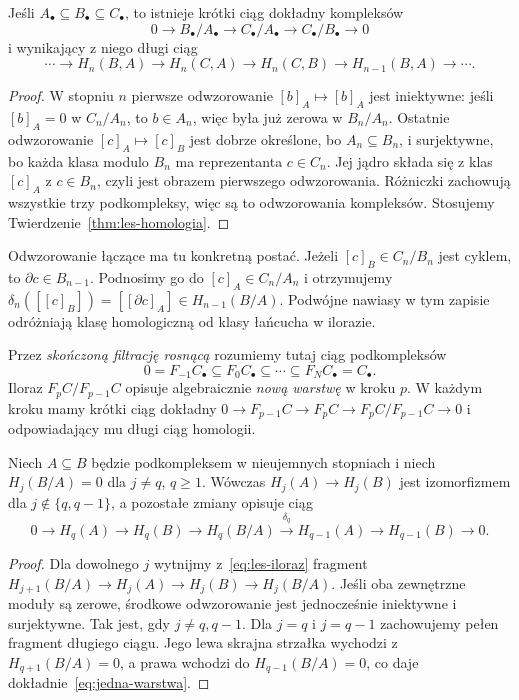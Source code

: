 \begin{stwierdzenie}
\label{prop:les-potrojny}
Jeśli $A_\bullet\subseteq B_\bullet
\subseteq C_\bullet$, to istnieje
krótki ciąg dokładny kompleksów
\[
 0\longrightarrow B_\bullet/A_\bullet
 \longrightarrow C_\bullet/A_\bullet
 \longrightarrow C_\bullet/B_\bullet
 \longrightarrow0
\]
i wynikający z niego długi ciąg
\[
 \cdots\to H_n(B,A)\to H_n(C,A)\to H_n(C,B)
 \to H_{n-1}(B,A)\to\cdots.
\]
\end{stwierdzenie}
\begin{proof}
W stopniu $n$ pierwsze odwzorowanie
$[b]_A\mapsto[b]_A$ jest iniektywne:
jeśli $[b]_A=0$ w $C_n/A_n$, to
$b\in A_n$, więc była już zerowa w
$B_n/A_n$. Ostatnie odwzorowanie
$[c]_A\mapsto[c]_B$ jest dobrze
określone, bo $A_n\subseteq B_n$,
i surjektywne, bo każda klasa modulo
$B_n$ ma reprezentanta $c\in C_n$.
Jej jądro składa się z klas
$[c]_A$ z $c\in B_n$, czyli jest
obrazem pierwszego odwzorowania.
Różniczki zachowują wszystkie trzy
podkompleksy, więc są to odwzorowania
kompleksów. Stosujemy
Twierdzenie~\ref{thm:les-homologia}.
\end{proof}

Odwzorowanie łączące ma tu konkretną postać. Jeżeli
$[c]_B\in C_n/B_n$ jest cyklem, to $\partial c\in B_{n-1}$.
Podnosimy go do $[c]_A\in C_n/A_n$ i otrzymujemy
$\delta_n([[c]_B])=[[\partial c]_A]\in H_{n-1}(B/A)$.
Podwójne nawiasy w tym zapisie odróżniają klasę
homologiczną od klasy łańcucha w ilorazie.

\begin{definicja}
\label{def:filtracja-kompleksu}
Przez \emph{skończoną filtrację rosnącą} rozumiemy tutaj ciąg
podkompleksów
\[
 0=F_{-1}C_\bullet\subseteq
 F_0C_\bullet\subseteq\cdots\subseteq
 F_NC_\bullet=C_\bullet.
\]
Iloraz $F_pC/F_{p-1}C$ opisuje
algebraicznie \emph{nową warstwę}
w kroku $p$. W każdym kroku mamy
krótki ciąg dokładny
$0\to F_{p-1}C\to F_pC\to
F_pC/F_{p-1}C\to0$
i odpowiadający mu długi ciąg homologii.
\end{definicja}

\begin{wniosek}
\label{wn:filtracja-jeden-stopien}
Niech $A\subseteq B$ będzie podkompleksem
w nieujemnych stopniach i niech
$H_j(B/A)=0$ dla $j\ne q$, $q\geq1$.
Wówczas $H_j(A)\to H_j(B)$ jest
izomorfizmem dla $j\notin\{q,q-1\}$,
a pozostałe zmiany opisuje ciąg
\begin{equation}\label{eq:jedna-warstwa}
 0\to H_q(A)\to H_q(B)\to H_q(B/A)
 \xrightarrow{\delta_q}H_{q-1}(A)
 \to H_{q-1}(B)\to0.
\end{equation}
\end{wniosek}
\begin{proof}
Dla dowolnego $j$ wytnijmy z~\eqref{eq:les-iloraz}
fragment $H_{j+1}(B/A)\to H_j(A)\to H_j(B)\to H_j(B/A)$.
Jeśli oba zewnętrzne moduły są zerowe,
środkowe odwzorowanie jest jednocześnie
iniektywne i surjektywne.
Tak jest, gdy $j\ne q,q-1$.
Dla $j=q$ i $j=q-1$ zachowujemy
pełen fragment długiego ciągu.
Jego lewa skrajna strzałka wychodzi
z $H_{q+1}(B/A)=0$, a prawa
wchodzi do $H_{q-1}(B/A)=0$,
co daje dokładnie~\eqref{eq:jedna-warstwa}.
\end{proof}

